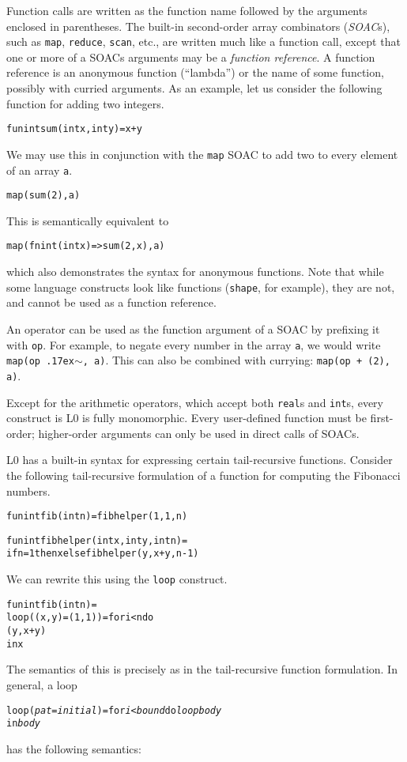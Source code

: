 \documentclass[oneside]{memoir}
\newcommand\realt[0]{\texttt{real}}
\newcommand\intt[0]{\texttt{int}}
\renewcommand\tilde[0]{{\raise.17ex\hbox{$\scriptstyle\sim$}}}
\begin{document}
Function calls are written as the function name followed by the
arguments enclosed in parentheses.  The built-in second-order array
combinators (\emph{SOAC}s), such as \texttt{map}, \texttt{reduce}, \texttt{scan}, etc., 
are written much like a function call,
except that one or more of a SOACs arguments may be a \emph{function
  reference}.  A function reference is an anonymous function
(``lambda'') or the name of some function, possibly with curried
arguments.  As an example, let us consider the following function for
adding two integers.
\begin{alltt}
fun int sum(int x, int y) = x + y
\end{alltt}
We may use this in conjunction with the \texttt{map} SOAC to add two
to every element of an array \texttt{a}.
\begin{alltt}
map(sum (2), a)
\end{alltt}
This is semantically equivalent to
\begin{alltt}
map(fn int (int x) => sum(2, x), a)
\end{alltt}
which also demonstrates the syntax for anonymous functions.  Note that
while some language constructs look like functions (\texttt{shape}, for
example), they are not, and cannot be used as a function reference.

An operator can be used as the function argument of a SOAC by
prefixing it with \texttt{op}.  For example, to negate every number in
the array \texttt{a}, we would write \texttt{map(op \tilde{}, a)}.
This can also be combined with currying: \texttt{map(op + (2), a)}.

Except for the arithmetic operators, which accept both \realt{}s
and \intt{}s, every construct is L0 is fully monomorphic.  Every
user-defined function must be first-order; higher-order arguments can
only be used in direct calls of SOACs.

L0 has a built-in syntax for expressing certain tail-recursive
functions.  Consider the following tail-recursive formulation of a
function for computing the Fibonacci numbers.
\begin{alltt}
  fun int fib(int n) = fibhelper(1,1,n)

  fun int fibhelper(int x, int y, int n) =
    if n = 1 then x else fibhelper(y, x+y, n-1)
\end{alltt}
We can rewrite this using the \texttt{loop} construct.
\begin{alltt}
  fun int fib(int n) =
    loop ((x, y) = (1,1)) = for i < n do
                              (y, x+y)
    in x
\end{alltt}
The semantics of this is precisely as in the tail-recursive function
formulation.  In general, a loop
\begin{alltt}
  loop (\emph{pat} = \emph{initial}) = for \emph{i} < \emph{bound} do \emph{loopbody}
  in \emph{body}
\end{alltt}
has the following semantics:
\end{document}
